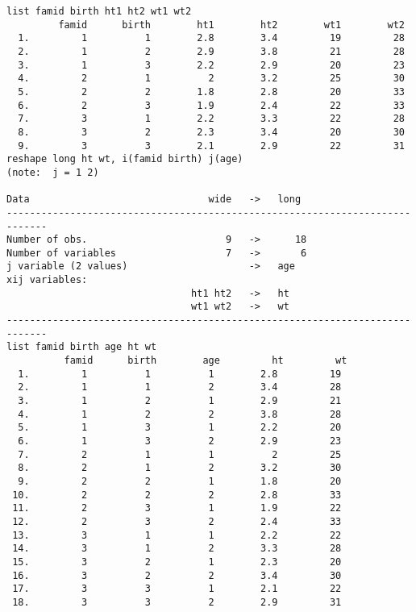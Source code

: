 \begin{lstlisting}
list famid birth ht1 ht2 wt1 wt2
         famid      birth        ht1        ht2        wt1        wt2
  1.         1          1        2.8        3.4         19         28
  2.         1          2        2.9        3.8         21         28
  3.         1          3        2.2        2.9         20         23
  4.         2          1          2        3.2         25         30
  5.         2          2        1.8        2.8         20         33
  6.         2          3        1.9        2.4         22         33
  7.         3          1        2.2        3.3         22         28
  8.         3          2        2.3        3.4         20         30
  9.         3          3        2.1        2.9         22         31
reshape long ht wt, i(famid birth) j(age)
(note:  j = 1 2)

Data                               wide   ->   long
-----------------------------------------------------------------------------
Number of obs.                        9   ->      18
Number of variables                   7   ->       6
j variable (2 values)                     ->   age
xij variables:
                                ht1 ht2   ->   ht
                                wt1 wt2   ->   wt
-----------------------------------------------------------------------------
list famid birth age ht wt
          famid      birth        age         ht         wt
  1.         1          1          1        2.8         19
  2.         1          1          2        3.4         28
  3.         1          2          1        2.9         21
  4.         1          2          2        3.8         28
  5.         1          3          1        2.2         20
  6.         1          3          2        2.9         23
  7.         2          1          1          2         25
  8.         2          1          2        3.2         30
  9.         2          2          1        1.8         20
 10.         2          2          2        2.8         33
 11.         2          3          1        1.9         22
 12.         2          3          2        2.4         33
 13.         3          1          1        2.2         22
 14.         3          1          2        3.3         28
 15.         3          2          1        2.3         20
 16.         3          2          2        3.4         30
 17.         3          3          1        2.1         22
 18.         3          3          2        2.9         31
\end{lstlisting}

